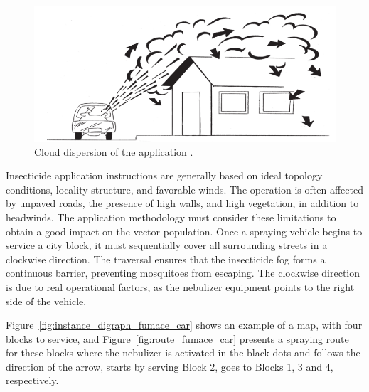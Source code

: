 \begin{figure}[!ht]
	\centering
	\includegraphics[scale=0.4]{images/cloud-dispersion.png}
	\caption{Cloud dispersion of the application \citep{brasil-dept-helth:2009}.}
	\label{fig:dispersion}
\end{figure}

Insecticide application instructions are generally based on ideal topology
conditions, locality structure, and favorable winds. The operation is often
affected by unpaved roads, the presence of high walls,  and  high   vegetation,
in  addition  to   headwinds.  The application methodology must consider these
limitations to obtain a good impact on the vector population. Once a spraying
vehicle begins to service a city block, it must sequentially cover all
surrounding streets in a clockwise direction. The traversal ensures that the
insecticide fog forms a continuous barrier, preventing mosquitoes from escaping.
The clockwise direction is due to real operational factors, as the nebulizer
equipment points to the right side of the vehicle.

Figure~\ref{fig:instance_digraph_fumace_car} shows an example of a map, with
four blocks to service, and Figure~\ref{fig:route_fumace_car} presents a
spraying route for these blocks where the nebulizer is activated in the black
dots and follows the direction of the arrow, starts by serving Block 2, goes to
Blocks 1, 3 and 4, respectively.

